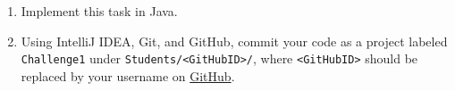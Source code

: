 \documentclass[11pt]{article}
\begin{document}
\begin{enumerate}
\item Implement this task in Java.
\item Using IntelliJ IDEA, Git, and GitHub, commit your code as a project labeled \texttt{Challenge1} under \texttt{Students/<GitHubID>/}, where \texttt{<GitHubID>} should be replaced by your username on \href{https://GitHub.com}{GitHub}.
\end{enumerate}
\end{document}
